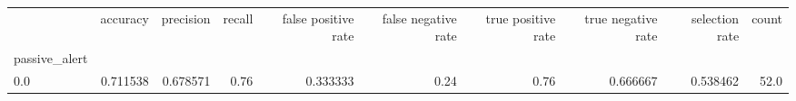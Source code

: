 \begin{tabular}{lrrrrrrrrr}
\toprule
{} &  accuracy &  precision &  recall &  false positive rate &  false negative rate &  true positive rate &  true negative rate &  selection rate &  count \\
passive\_alert &           &            &         &                      &                      &                     &                     &                 &        \\
\midrule
0.0           &  0.711538 &   0.678571 &    0.76 &             0.333333 &                 0.24 &                0.76 &            0.666667 &        0.538462 &   52.0 \\
\bottomrule
\end{tabular}

